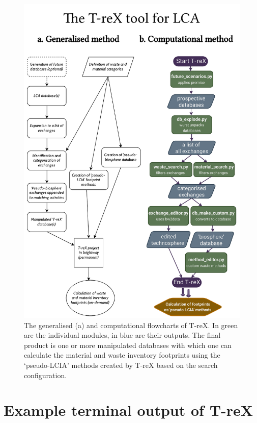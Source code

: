 \documentclass{article}
\begin{document}
\begin{figure}[H]
    \centering
    \includegraphics[height=0.8\textheight]{T-reX_flowchart-supplementary.pdf}
    \caption{The generalised (a) and computational flowcharts of T-reX. In green are the individual modules, in blue are their outputs. The final product is one or more manipulated databases with which one can calculate the material and waste inventory footprints using the `pseudo-LCIA' methods created by T-reX based on the search configuration.}\label{fig:flowchart}
\end{figure}

\clearpage

\section{Example terminal output of T-reX}
\end{document}
